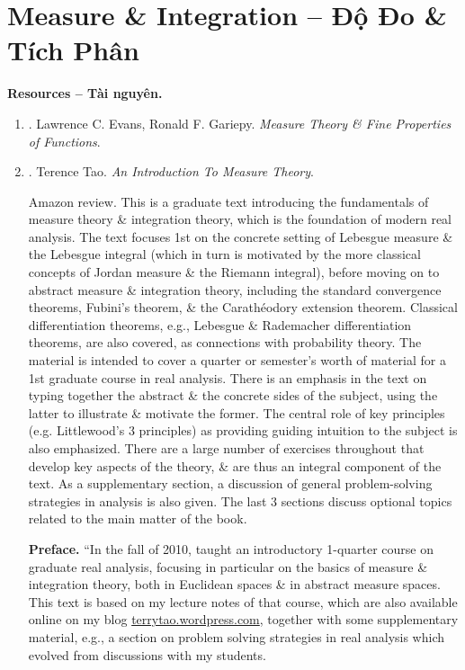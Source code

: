 \documentclass{article}
\begin{document}
\section{Measure \& Integration -- Độ Đo \& Tích Phân}
\textbf{\textsf{Resources -- Tài nguyên.}}
\begin{enumerate}
	\item \cite{Evans_Gariepy2015}. {\sc Lawrence C. Evans, Ronald F. Gariepy}. {\it Measure Theory \& Fine Properties of Functions}.
	\item \cite{Tao_measure_theory}. {\sc Terence Tao}. {\it An Introduction To Measure Theory}. {}
	
	{\sf Amazon review.} This is a graduate text introducing the fundamentals of measure theory \& integration theory, which is the foundation of modern real analysis. The text focuses 1st on the concrete setting of Lebesgue measure \& the Lebesgue integral (which in turn is motivated by the more classical concepts of Jordan measure \& the Riemann integral), before moving on to abstract measure \& integration theory, including the standard convergence theorems, Fubini's theorem, \& the Carath\'eodory extension theorem. Classical differentiation theorems, e.g., Lebesgue \& Rademacher differentiation theorems, are also covered, as connections with probability theory. The material is intended to cover a quarter or semester's worth of material for a 1st graduate course in real analysis. There is an emphasis in the text on typing together the abstract \& the concrete sides of the subject, using the latter to illustrate \& motivate the former. The central role of key principles (e.g. Littlewood's 3 principles) as providing guiding intuition to the subject is also emphasized. There are a large number of exercises throughout that develop key aspects of the theory, \& are thus an integral component of the text. As a supplementary section, a discussion of general problem-solving strategies in analysis is also given. The last 3 sections discuss optional topics related to the main matter of the book.
	
	{\bf Preface.} ``In the fall of 2010, taught an introductory 1-quarter course on graduate real analysis, focusing in particular on the basics of measure \& integration theory, both in Euclidean spaces \& in abstract measure spaces. This text is based on my lecture notes of that course, which are also available online
	on my blog \url{terrytao.wordpress.com}, together with some supplementary
	material, e.g., a section on problem solving strategies in real analysis which evolved from discussions with my students.
	

\end{enumerate}
\end{document}
